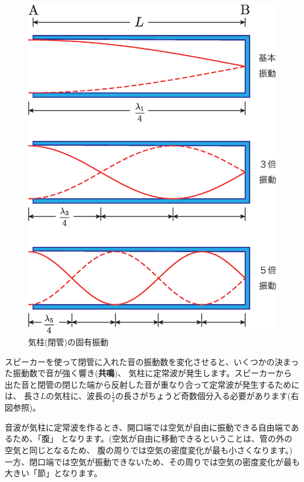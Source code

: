 \begin{figure}
\vspace*{-0.8cm}
\begin{center}
\includegraphics[scale=0.4]{18_Resonance/AirColumn.eps}\\
気柱(閉管)の固有振動\\
\end{center}
\end{figure}


スピーカーを使って閉管に入れた音の振動数を変化させると、いくつかの決まった振動数で音が強く響き({\bf 共鳴})、
気柱に定常波が発生します。スピーカーから出た音と閉管の閉じた端から反射した音が重なり合って定常波が発生するためには、
長さ$L$の気柱に、波長の$\frac{1}{4}$の長さがちょうど奇数個分入る必要があります(右図参照)。

音波が気柱に定常波を作るとき、開口端では空気が自由に振動できる自由端であるため、「腹」
となります。(空気が自由に移動できるということは、管の外の空気と同じとなるため、
腹の周りでは空気の密度変化が最も小さくなります。)
一方、閉口端では空気が振動できないため、その周りでは空気の密度変化が最も大きい「節」となります。

